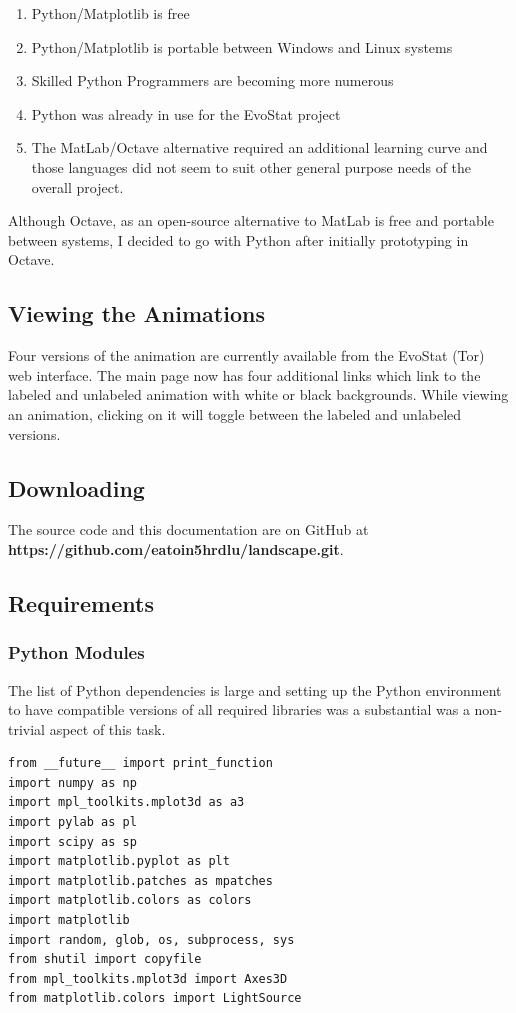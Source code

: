 \documentclass[10pt,letterpaper]{article}
\begin{document}
\begin{enumerate}[itemsep=1pt, topsep=2pt, partopsep=0pt]
\item Python/Matplotlib is free
\item Python/Matplotlib is portable between Windows and Linux systems
\item Skilled Python Programmers are becoming more numerous
\item Python was already in use for the EvoStat project
\item The MatLab/Octave alternative required an additional learning curve and those languages did not seem to suit other general purpose needs of the overall project.
\end{enumerate}
Although Octave, as an open-source alternative to MatLab is free and portable between systems, I decided to go with Python after initially prototyping in Octave.

\subsection*{Viewing the Animations}
Four versions of the animation are currently available from the EvoStat (Tor) web interface.  The main page now has four additional links which link to the labeled and unlabeled animation with white or black backgrounds. While viewing an animation, clicking on it will toggle between the labeled and unlabeled versions.
\subsection*{Downloading}
The source code and this documentation are on GitHub at {\bf https://github.com/eatoin5hrdlu/landscape.git}.
\subsection*{Requirements}
\subsubsection*{Python Modules}
The list of Python dependencies is large and setting up the Python environment to have compatible versions of all required libraries was a substantial was a non-trivial aspect of this task.
\begin{lstlisting}
from __future__ import print_function
import numpy as np
import mpl_toolkits.mplot3d as a3
import pylab as pl
import scipy as sp
import matplotlib.pyplot as plt
import matplotlib.patches as mpatches
import matplotlib.colors as colors
import matplotlib
import random, glob, os, subprocess, sys
from shutil import copyfile
from mpl_toolkits.mplot3d import Axes3D
from matplotlib.colors import LightSource
\end{lstlisting}
\end{document}
